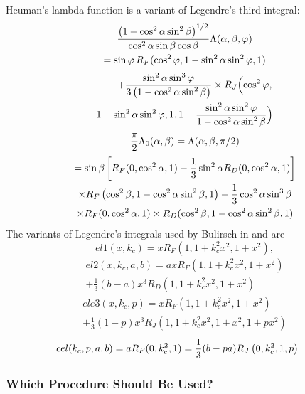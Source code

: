 \documentclass[twoside]{MATH77}
\begin{document}
Heuman's lambda function \cite{Heuman:1941:TCE} is a variant of Legendre's third integral:
\begin{multline}\label{O11}
\frac{\left( 1-\cos ^2\alpha \sin ^2\beta \right) ^{1/2}}{\cos
^2\alpha \sin \beta \cos \beta }\Lambda (\alpha ,\beta ,\varphi )\\
=\sin \varphi \,R_F(\cos ^2\varphi ,1-\sin ^2\alpha
\sin ^2\varphi ,1)\vspace{2pt} \\ \displaystyle\qquad +\frac{\sin ^2\alpha
\sin ^3\varphi }{3\left( 1-\cos ^2\alpha \sin ^2\beta \right) }\times
R_J \Bigl(\cos ^2\varphi ,\\
1-\sin ^2\alpha \sin^2\varphi ,1,1-\frac{\sin ^2\alpha \sin ^2\varphi }
{1-\cos ^2\alpha \sin^2\beta }\Bigr)
\end{multline}
\begin{multline}\label{O12}
\frac \pi 2\Lambda _0(\alpha ,\beta )=\Lambda (\alpha ,\beta
,\pi /2)\vspace{2pt}\\
=\sin \beta \left[ R_F(0,\cos^2\alpha ,1)-\frac 13\sin ^2\alpha
R_D(0,\cos ^2\alpha ,1)\right]\\
\times R_F\left( \cos ^2\beta ,1-\cos^2\alpha \sin ^2\beta ,1\right)
-\frac 13\cos ^2\alpha \sin ^3\beta\\
\times R_F(0,\cos ^2\alpha ,1)\times R_D(\cos ^2\beta ,1-\cos ^2\alpha
\sin ^2\beta ,1)
\end{multline}
The variants of Legendre's integrals used by Bulirsch in
\cite{Bulirsch:1965:NCE} and \cite{Bulirsch:1969:NCE} are
\begin{equation}
\label{O13}el1(x,k_c)=xR_F\left( 1,1+k_c^2x^2,1+x^2\right) ,
\end{equation}
\begin{multline}\label{O14}
el2(x,k_c,a,b)=axR_F\left( 1,1+k_c^2x^2,1+x^2\right)\\
+\frac 13(b-a)x^3R_D\left( 1,1+k_c^2x^2,1+x^2\right)
\end{multline}
\begin{multline}\label{O15}
ele3(x,k_c,p)=xR_F\left( 1,1+k_c^2x^2,1+x^2\right)\\
+\frac 13(1-p)x^3R_J\left( 1,1+k_c^2x^2,1+x^2,1+p x^2\right)
\end{multline}
\begin{equation}\label{O16}
\hspace{-15pt}cel(k_c,p,a,b)=aR_F(0,k_c^2,1)=\frac 13(b-pa)R_J\left(
0,k_c^2,1,p\right)
\end{equation}
\subsubsection{Which Procedure Should Be Used?}
\end{document}
